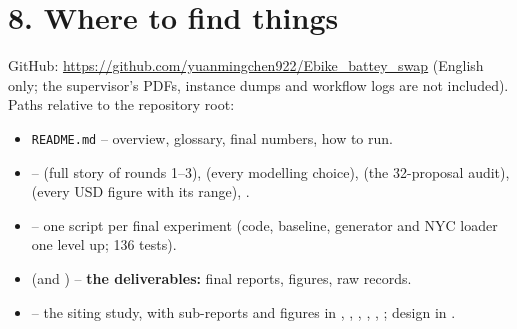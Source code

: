 \section*{8. Where to find things}
\noindent GitHub: \url{https://github.com/yuanmingchen922/Ebike_battey_swap} (English only; the supervisor's PDFs, instance dumps and workflow logs are not included). Paths relative to the repository root:
\begin{itemize}\setlength{\itemsep}{0pt}
  \item \texttt{README.md} -- overview, glossary, final numbers, how to run.
  \item {} --  (full story of rounds 1--3),  (every modelling choice),  (the 32-proposal audit),  (every USD figure with its range), .
  \item {} -- one script per final experiment (code, baseline, generator and NYC loader one level up; 136 tests).
  \item {} (and ) -- \textbf{the deliverables:} final reports, figures, raw records.
  \item {} -- the siting study, with sub-reports and figures in , , , , , ; design in .
\end{itemize}


